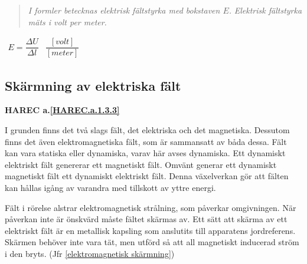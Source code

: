 \begin{quote}
\emph{I formler betecknas elektrisk fältstyrka med bokstaven \(E\).}
\emph{Elektrisk fältstyrka mäts i volt per meter.}
\end{quote}

\(
\begin{array}{cc}
E=\dfrac{\Delta U}{\Delta l} & \dfrac{[volt]}{[meter]}
\end{array}
\)

\subsection{Skärmning av elektriska fält}
\textbf{HAREC a.\ref{HAREC.a.1.3.3}\label{myHAREC.a.1.3.3}}
\label{elektrostatik skärmning}

I grunden finns det två slags fält, det elektriska och det magnetiska. Dessutom
finns det även elektromagnetiska fält, som är sammansatt av båda dessa. Fält
kan vara statiska eller dynamiska, varav här avses dynamiska. Ett dynamiskt
elektriskt fält genererar ett magnetiskt fält. Omvänt generar ett dynamiskt
magnetiskt fält ett dynamiskt elektriskt fält. Denna växelverkan gör att fälten
kan hållas igång av varandra med tillskott av yttre energi.

Fält i rörelse alstrar elektromagnetisk strålning, som påverkar omgivningen. När
påverkan inte är önskvärd måste fältet skärmas av. Ett sätt att skärma av ett
elektriskt fält är en metallisk kapsling som anslutits till apparatens
jordreferens. Skärmen behöver inte vara tät, men utförd så att all magnetiskt
inducerad ström i den bryts. (Jfr \ref{elektromagnetisk skärmning})
